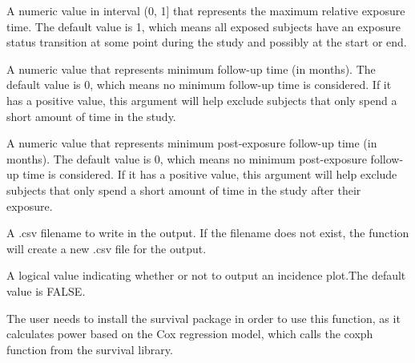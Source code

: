 \documentclass[a4paper]{book}
\begin{document}
\begin{Arguments}
\begin{ldescription}
\item[\code{maxrelexptime}] 
A numeric value in interval (0, 1] that represents the maximum relative exposure time. The default value is 1, which means all exposed subjects have an exposure status transition at some point during the study and possibly at the start or end.

\item[\code{min.futime}] 
A numeric value that represents minimum follow-up time (in months). The default value is 0, which means no minimum follow-up time is considered. If it has a positive value, this argument will help exclude subjects that only spend a short amount of time in the study.

\item[\code{min.postexp.futime}] 
A numeric value that represents minimum post-exposure follow-up time (in months). The default value is 0, which means no minimum post-exposure follow-up time is considered. If it has a positive value, this argument will help exclude subjects that only spend a short amount of time in the study after their exposure.

\item[\code{output.fn}] 
A .csv filename to write in the output. If the filename does not exist, the function will create a new .csv file for the output.

\item[\code{simu.plot}] 
A logical value indicating whether or not to output an incidence plot.The default value is FALSE.

\end{ldescription}
\end{Arguments}
%
\begin{Details}\relax
The user needs to install the survival package in order to use this function, as it calculates power based on the Cox regression model, which calls the coxph function from the survival library.
\end{Details}
%
\end{document}
